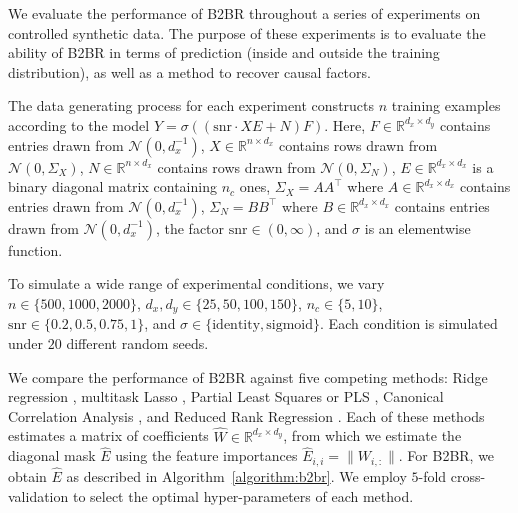 We evaluate the performance of B2BR throughout a series of experiments on controlled synthetic data.
%
The purpose of these experiments is to evaluate the ability of B2BR in terms of prediction (inside and outside the training distribution), as well as a method to recover causal factors.

The data generating process for each experiment constructs $n$ training examples according to the model $Y = \sigma((\text{snr} \cdot XE + N)F)$.
%
Here, 
    $F \in \mathbb{R}^{d_x \times d_y}$ contains entries drawn from $\mathcal{N}(0, d_x^{-1})$,
    $X \in \mathbb{R}^{n \times d_x}$ contains rows drawn from $\mathcal{N}(0, \Sigma_X)$,
    $N \in \mathbb{R}^{n \times d_x}$ contains rows drawn from $\mathcal{N}(0, \Sigma_N)$,
    $E \in \mathbb{R}^{d_x \times d_x}$ is a binary diagonal matrix containing $n_c$ ones,
    $\Sigma_X = AA^\top$ where $A \in \mathbb{R}^{d_x \times d_x}$ contains entries drawn from $\mathcal{N}(0, d_x^{-1})$,
    $\Sigma_N = BB^\top$ where $B \in \mathbb{R}^{d_x \times d_x}$ contains entries drawn from $\mathcal{N}(0, d_x^{-1})$,
the factor $\text{snr} \in (0, \infty)$, and $\sigma$ is an elementwise function.

To simulate a wide range of experimental conditions, we vary $n \in \{500, 1000, 2000\}$, $d_x, d_y \in \{ 25, 50, 100, 150 \}$, $n_c \in \{ 5, 10 \}$, $\text{snr} \in \{ 0.2, 0.5, 0.75, 1 \}$, and $\sigma \in \{ \text{identity}, \text{sigmoid} \}$.
%
Each condition is simulated under $20$ different random seeds. 

We compare the performance of B2BR against five competing methods:
%
Ridge regression \citep{}, multitask Lasso \citep{}, Partial Least Squares or PLS \citep[PLS]{}, Canonical Correlation Analysis \citep[CCA]{}, and Reduced Rank Regression \citep[RRR]{}.
%
Each of these methods estimates a matrix of coefficients $\hat{W} \in \mathbb{R}^{d_x \times d_y}$, from which we estimate the diagonal mask $\hat{E}$ using the feature importances $\hat{E}_{i,i} = \| W_{i, :} \|$.
%
For B2BR, we obtain $\hat{E}$ as described in Algorithm~\ref{algorithm:b2br}.
%
We employ $5$-fold cross-validation to select the optimal hyper-parameters of each method. 

